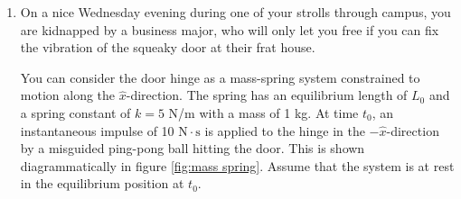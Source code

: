 \documentclass[12pt]{report}
\begin{document}
\begin{enumerate}
    \item On a nice Wednesday evening during one of your strolls through campus, you are kidnapped by a business major, who will only let you free if you can fix the vibration of the squeaky door at their frat house.

You can consider the door hinge as a mass-spring system constrained to motion along the $\hat{x}$-direction. The spring has an equilibrium length of $L_0$ and a spring constant of $k=5$ N/m with a mass of 1 kg. At time $t_0$, an instantaneous impulse of 10 $\mathrm{N}\cdot \mathrm{s}$ is applied to the hinge in the $-\hat{x}$-direction by a misguided ping-pong ball hitting the door. This is shown diagrammatically in figure \ref{fig:mass spring}. Assume that the system is at rest in the equilibrium position at $t_0$.
\begin{figure}[ht]
    \centering
    



\begin{tikzpicture}[x=0.75pt,y=0.75pt,yscale=-1,xscale=1]


\end{tikzpicture}
\end{figure}
\end{enumerate}
\end{document}
